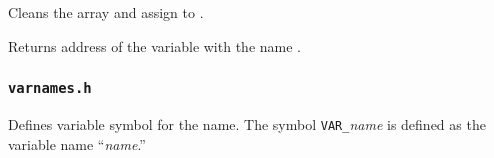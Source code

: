   
      Cleans the array  and assign  to .
  
  
      Returns address of the variable with the name .



\subsubsection{\texttt{varnames.h}}

  Defines variable symbol for the name.
  The symbol \texttt{VAR\_}\textit{name} is defined as the variable name ``\textit{name}.''
  
